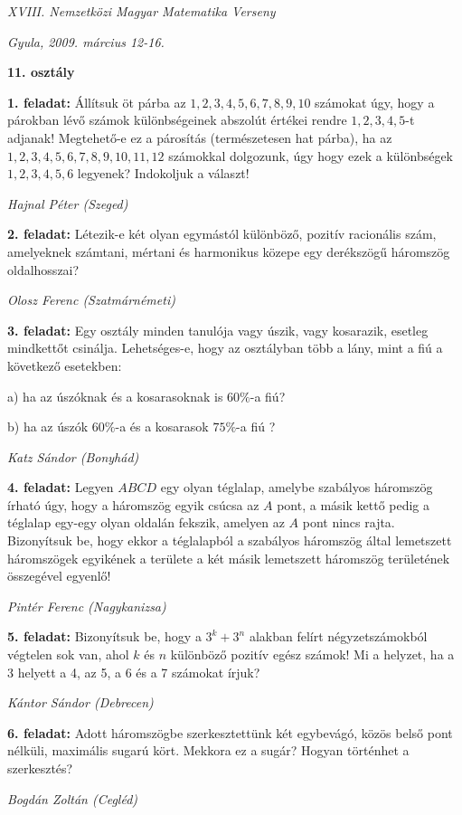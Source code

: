 \documentclass[a4paper,10pt]{article}
\def\ki#1#2{\hfill {\it #1 (#2)}\medskip}
\begin{document}
\begin{center} \Large {\em XVIII. Nemzetközi Magyar Matematika Verseny} \end{center}
\begin{center} \large{\em Gyula, 2009. március 12-16.} \end{center}
\smallskip
\begin{center} \large{\bf 11. osztály} \end{center}
\bigskip 

{\bf 1. feladat: }
Állítsuk öt párba az $1, 2, 3, 4, 5, 6, 7, 8, 9, 10$ számokat úgy, hogy a
párokban lévő számok különbségeinek abszolút értékei rendre $1, 2, 3, 4, 5$-t adjanak!
Megtehető-e ez a párosítás (természetesen hat párba), ha az $1, 2, 3, 4, 5, 6, 7, 8, 9, 10, 11, 12$
számokkal dolgozunk, úgy hogy ezek a különbségek $1, 2, 3, 4, 5, 6$ legyenek? Indokoljuk a
választ!

\ki{Hajnal Péter }{Szeged}\medskip

{\bf 2. feladat: } 
Létezik-e két olyan egymástól különböző, pozitív racionális szám,
amelyeknek számtani, mértani és harmonikus közepe egy derékszögű háromszög
oldalhosszai?

\ki{Olosz Ferenc }{Szatmárnémeti}\medskip

{\bf 3. feladat: } 
Egy osztály minden tanulója vagy úszik, vagy kosarazik, esetleg
mindkettőt csinálja.
Lehetséges-e, hogy az osztályban több a lány, mint a fiú a következő esetekben:

a) ha az úszóknak és a kosarasoknak is $60 \%$-a fiú?

b) ha az úszók $60 \%$-a és a kosarasok $75 \%$-a fiú ?


\ki{Katz Sándor }{Bonyhád}\medskip

{\bf 4. feladat: }
Legyen $ABCD$ egy olyan téglalap, amelybe szabályos háromszög írható
úgy, hogy a háromszög egyik csúcsa az $A$ pont, a másik kettő pedig a téglalap egy-egy olyan
oldalán fekszik, amelyen az $A$ pont nincs rajta. Bizonyítsuk be, hogy ekkor a téglalapból a
szabályos háromszög által lemetszett háromszögek egyikének a területe a két másik lemetszett
háromszög területének összegével egyenlő!

\ki{Pintér Ferenc }{Nagykanizsa}\medskip

{\bf 5. feladat: }
Bizonyítsuk be, hogy a $3^k+3^n$ alakban felírt négyzetszámokból végtelen
sok van, ahol $k$ és $n$ különböző pozitív egész számok! Mi a helyzet, ha a 3 helyett a 4, az 5, a
6 és a 7 számokat írjuk?
 
\ki{Kántor Sándor }{Debrecen}\medskip

{\bf 6. feladat: } 
Adott háromszögbe szerkesztettünk két egybevágó, közös belső pont
nélküli, maximális sugarú kört. Mekkora ez a sugár? Hogyan történhet a szerkesztés?


\ki{Bogdán Zoltán }{Cegléd}\medskip

\vfill
\end{document}
